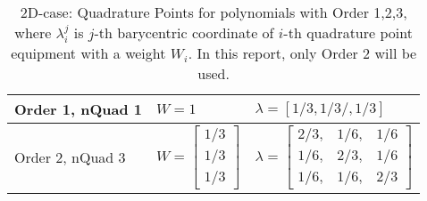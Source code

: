 \begin{table}[ht]
  \centering
  \caption{2D-case: Quadrature Points for polynomials with Order 1,2,3, 
  where $\lambda_i^j$ is $j$-th barycentric coordinate of $i$-th quadrature point equipment with a weight $W_i$. 
  In this report, only Order 2 will be used.}
  \label{tab:quadrature-points-2d}
  \begin{tabular}{l|l|l}
    \hline
    Order 1, nQuad 1
    & $W=1$
    & $\lambda=[1/3,1/3/,1/3]$ \\
    \hline
    Order 2, nQuad 3 
    & $W=\left[
      \begin{array}{c}
        1/3 \\
        1/3 \\
        1/3
      \end{array}\right]$
    & $\lambda=\left[
      \begin{array}{ccc}
2/3, & 1/6, & 1/6 \\
1/6, & 2/3, & 1/6 \\
1/6, & 1/6, & 2/3
      \end{array}
      \right]$ \\
    \hline
  \end{tabular}
\end{table}
